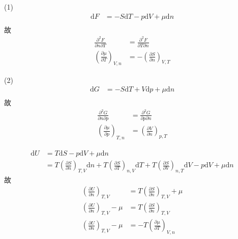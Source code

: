 \documentclass{phyasgn}
\renewcommand{\d}{\mathrm{d}}
\begin{document}
\begin{sol}[3]
    (1)\begin{align*}
        \d F&=-S\d T-p\d V+\mu\d n\\
    \end{align*}
    故
    \begin{align*}
        \frac{\partial^2 F}{\partial n\partial T}&=\frac{\partial^2 F}{\partial T\partial n}\\
        (\frac{\partial \mu}{\partial T})_{V,n}&=-(\frac{\partial S}{\partial n})_{V,T}
    \end{align*}

    (2)\begin{align*}
        \d G&=-S\d T+V\d p+\mu\d n\\
    \end{align*}
    故
    \begin{align*}
        \frac{\partial^2 G}{\partial n\partial p}&=\frac{\partial^2 G}{\partial p\partial n}\\
        (\frac{\partial \mu}{\partial p})_{T,n}&=(\frac{\partial V}{\partial n})_{p,T}
    \end{align*}
\end{sol}\par

\begin{sol}[4]
    \begin{align*}
        \d U&=T\d S-p\d V+\mu\d n\\
        &=T(\frac{\partial S}{\partial n})_{T,V}\d n+T(\frac{\partial S}{\partial T})_{n,V}\d T+T(\frac{\partial S}{\partial V})_{n,T}\d V-p\d V+\mu\d n
    \end{align*}
    故
    \begin{align*}
        (\frac{\partial U}{\partial n})_{T,V}&=T(\frac{\partial S}{\partial n})_{T,V}+\mu\\
        (\frac{\partial U}{\partial n})_{T,V}-\mu&=T(\frac{\partial S}{\partial n})_{T,V}\\
        (\frac{\partial U}{\partial n})_{T,V}-\mu&=-T(\frac{\partial \mu}{\partial T})_{V,n}
    \end{align*}
\end{sol}\par
\end{document}
